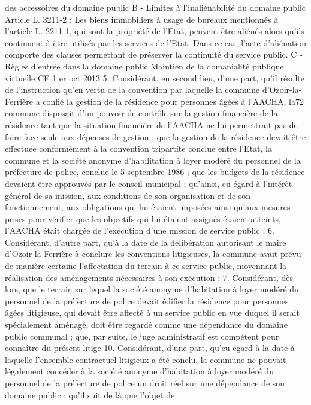\documentclass[11pt,a4paper]{report}
\begin{document}
des accessoires du domaine public
B - Limites à l’inaliénabilité du domaine public
Article L. 3211-2 : Les biens immobiliers à usage de bureaux mentionnés à l'article L. 2211-1, qui sont la
propriété de l'Etat, peuvent être aliénés alors qu'ils continuent à être utilisés par les services de l'Etat. Dans ce
cas, l'acte d'aliénation comporte des clauses permettant de préserver la continuité du service public.
C - Règles d’entrée dans la domaine public
Maintien de la domanialité publique virtuelle CE 1 er oct 2013 
5. Considérant, en second lieu, d'une part, qu'il résulte de l'instruction qu'en vertu de la convention par laquelle
la commune d'Ozoir-la-Ferrière a confié la gestion de la résidence pour personnes âgées à l'AACHA, la72
commune disposait d'un pouvoir de contrôle sur la gestion financière de la résidence tant que la situation
financière de l'AACHA ne lui permettrait pas de faire face seule aux dépenses de gestion ; que la gestion de la
résidence devait être effectuée conformément à la convention tripartite conclue entre l'Etat, la commune et la
société anonyme d'habilitation à loyer modéré du personnel de la préfecture de police, conclue le 5 septembre
1986 ; que les budgets de la résidence devaient être approuvés par le conseil municipal ; qu'ainsi, eu égard à
l'intérêt général de sa mission, aux conditions de son organisation et de son fonctionnement, aux obligations qui
lui étaient imposées ainsi qu'aux mesures prises pour vérifier que les objectifs qui lui étaient assignés étaient
atteints, l'AACHA était chargée de l'exécution d'une mission de service public ;
6. Considérant, d'autre part, qu'à la date de la délibération autorisant le maire d'Ozoir-la-Ferrière à conclure
les conventions litigieuses, la commune avait prévu de manière certaine l'affectation du terrain à ce service
public, moyennant la réalisation des aménagements nécessaires à son exécution ;
7. Considérant, dès lors, que le terrain sur lequel la société anonyme d'habitation à loyer modéré du personnel
de la préfecture de police devait édifier la résidence pour personnes âgées litigieuse, qui devait être affecté à un
service public en vue duquel il serait spécialement aménagé, doit être regardé comme une dépendance du
domaine public communal ; que, par suite, le juge administratif est compétent pour connaître du présent litige
10. Considérant, d'une part, qu'eu égard à la date à laquelle l'ensemble contractuel litigieux a été conclu, la
commune ne pouvait légalement concéder à la société anonyme d'habitation à loyer modéré du personnel de la
préfecture de police un droit réel sur une dépendance de son domaine public ; qu'il suit de là que l'objet de
\end{document}
